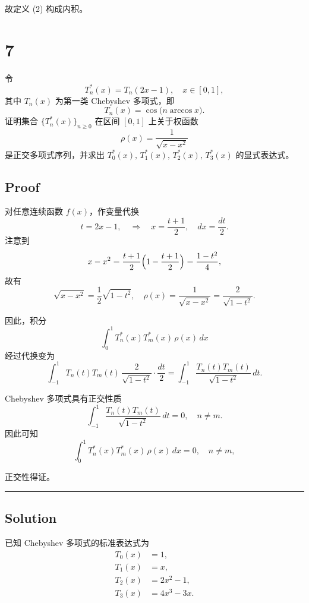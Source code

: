 \documentclass[11pt]{article}
\begin{document}
故定义 (2) 构成内积。

    \section{7}\label{section}

令\\
\[
T^*_n(x)=T_n(2x-1),\quad x\in [0,1],
\] 其中 \(T_n(x)\) 为第一类 Chebyshev 多项式，即\\
\[
T_n(x)=\cos\bigl(n\arccos x\bigr).
\] 证明集合 \(\{T^*_n(x)\}_{n\ge0}\) 在区间 \([0,1]\) 上关于权函数\\
\[
\rho(x)=\frac{1}{\sqrt{x-x^2}}
\] 是正交多项式序列，并求出
\(T^*_0(x),\,T^*_1(x),\,T^*_2(x),\,T^*_3(x)\) 的显式表达式。

    \subsection{Proof}\label{proof}

对任意连续函数 \(f(x)\)，作变量代换\\
\[
t=2x-1,\quad \Rightarrow\quad x=\frac{t+1}{2},\quad dx=\frac{dt}{2}.
\] 注意到\\
\[
x-x^2=\frac{t+1}{2}\Bigl(1-\frac{t+1}{2}\Bigr)
=\frac{1-t^2}{4},
\] 故有\\
\[
\sqrt{x-x^2}=\frac{1}{2}\sqrt{1-t^2},\quad \rho(x)=\frac{1}{\sqrt{x-x^2}}=\frac{2}{\sqrt{1-t^2}}.
\]

因此，积分 \[
\int_0^1 T^*_n(x)T^*_m(x)\,\rho(x)\,dx
\] 经过代换变为 \[
\int_{-1}^{1} T_n(t)T_m(t)\,\frac{2}{\sqrt{1-t^2}}\cdot \frac{dt}{2}
=\int_{-1}^{1} \frac{T_n(t)T_m(t)}{\sqrt{1-t^2}}\,dt.
\]

Chebyshev 多项式具有正交性质\\
\[
\int_{-1}^{1} \frac{T_n(t)T_m(t)}{\sqrt{1-t^2}}\,dt=0,\quad n\neq m.
\] 因此可知\\
\[
\int_0^1 T^*_n(x)T^*_m(x)\,\rho(x)\,dx=0,\quad n\neq m,
\]

正交性得证。

\begin{center}\rule{0.5\linewidth}{0.5pt}\end{center}

\subsection{Solution}\label{solution}

已知 Chebyshev 多项式的标准表达式为 \[
\begin{aligned}
T_0(x)&=1,\\[1mm]
T_1(x)&=x,\\[1mm]
T_2(x)&=2x^2-1,\\[1mm]
T_3(x)&=4x^3-3x.
\end{aligned}
\]
\end{document}
